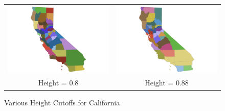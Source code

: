 \begin{figure}[th]
\caption{Various Height Cutoffs for California \label{fig:caliclusters}}
\begin{tabular}{cc}
\includegraphics[scale=0.1]{./figures/insetmaps/california_clustermap_800_inset6.png} & \includegraphics[scale=0.1]{./figures/insetmaps/california_clustermap_880_inset6.png} \\
Height = 0.8 & Height = 0.88 \\

\end{tabular}
\end{figure}
